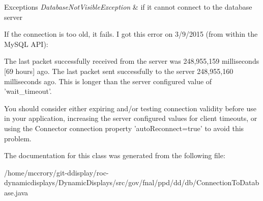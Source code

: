 \begin{DoxyExceptions}{Exceptions}
{\em Database\-Not\-Visible\-Exception} & if it cannot connect to the database server \\
\hline
\end{DoxyExceptions}
If the connection is too old, it fails. I got this error on 3/9/2015 (from within the My\-S\-Q\-L A\-P\-I)\-:


\begin{DoxyPre}
The last packet successfully received from the server was 248,955,159 milliseconds [69 hours] ago. 
The last packet sent successfully to the server 248,955,160 milliseconds ago. 
This is longer than the server configured value of 'wait\_timeout'.\end{DoxyPre}



\begin{DoxyPre}You should consider either expiring and/or testing connection validity before use in your application,
increasing the server configured values for client timeouts, or using the Connector connection property
'autoReconnect=true' to avoid this problem.
\end{DoxyPre}


The documentation for this class was generated from the following file\-:\begin{DoxyCompactItemize}
\item 
/home/mccrory/git-\/ddisplay/roc-\/dynamicdisplays/\-Dynamic\-Displays/src/gov/fnal/ppd/dd/db/Connection\-To\-Database.\-java\end{DoxyCompactItemize}
